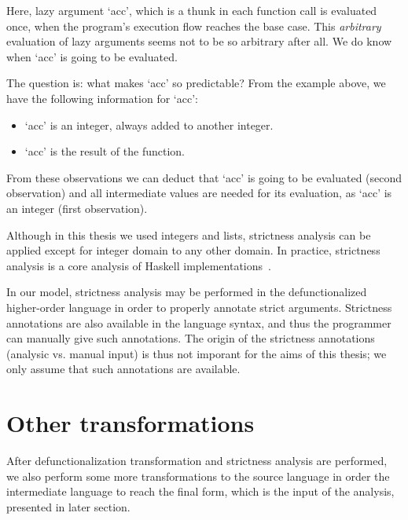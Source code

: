 \documentclass[diploma]{softlab-thesis}
\begin{document}
Here, lazy argument `acc', which is a thunk in each function call is evaluated once, when the program's 
execution flow reaches the base case. This \textit{arbitrary} evaluation of lazy arguments seems not to 
be so arbitrary after all. We do know when `acc' is going to be evaluated.

The question is: what makes `acc' so predictable? From the example above, we have the following information for `acc':
\begin{itemize}
  \item `acc' is an integer, always added to another integer.
  \item `acc' is the result of the function.
\end{itemize}

From these observations we can deduct that `acc' is going to be evaluated (second observation) and 
all intermediate values are needed for its evaluation, as `acc' is an integer (first observation).

Although in this thesis we used integers and lists, strictness
analysis can be applied except for integer domain to any other domain. In practice, strictness analysis is a
core analysis of Haskell
implementations~\cite{PeytonJones:1991:UVF:645420.652528,burn:lemetayer:1996,Holdermans:2010:MSM:2088270.2088274}.

In our model, strictness analysis may be performed in the
defunctionalized higher-order language in order to properly annotate
strict arguments. Strictness annotations are also available in the
language syntax, and thus the programmer can manually give such
annotations. The origin of the strictness annotations (analysic
vs. manual input) is thus not imporant for the aims of this thesis; we
only assume that such annotations are available.

\section {Other transformations}
\label{sec:other-transformations}

After defunctionalization transformation and strictness analysis are performed, we also 
perform some more transformations to the source language in order the intermediate 
language to reach the final form, which is the input of the analysis, presented in later section.
\end{document}
